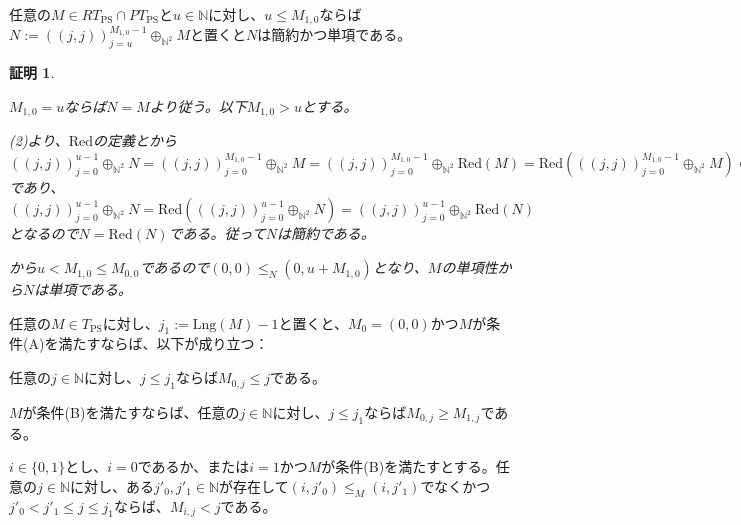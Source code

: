 \documentclass[dvipdfmx,uplatex]{jsarticle}
\theoremstyle{customnonumberbreakfortheorem}
\theoremstyle{customnonumberbreakforproof}
\newtheorem{hideableproof}{証明}
\begin{document}
\begin{lemma}[簡約性と左端の関係]\label{簡約性と左端の関係}
	任意の\(M \in RT_{\textrm{PS}} \cap PT_{\textrm{PS}}\)と\(u \in \mathbb{N}\)に対し、\(u \leq M_{1,0}\)ならば\(N := ((j,j))_{j=u}^{M_{1,0}-1} \oplus_{\mathbb{N}^2} M\)と置くと\(N\)は簡約かつ単項である。
\end{lemma}

\begin{hideableproof}
	\begin{indented}
		\item \(M_{1,0} = u\)ならば\(N = M\)より従う。以下\(M_{1,0} > u\)とする。
		\item {} (2)より、\(\textrm{Red}\)の定義とから\(((j,j))_{j=0}^{u-1} \oplus_{\mathbb{N}^2} N = ((j,j))_{j=0}^{M_{1,0}-1} \oplus_{\mathbb{N}^2} M = ((j,j))_{j=0}^{M_{1,0}-1} \oplus_{\mathbb{N}^2} \textrm{Red}(M) = \textrm{Red}(((j,j))_{j=0}^{M_{1,0}-1} \oplus_{\mathbb{N}^2} M) \in RT_{\textrm{PS}}\)であり、\(((j,j))_{j=0}^{u-1} \oplus_{\mathbb{N}^2} N = \textrm{Red}(((j,j))_{j=0}^{u-1} \oplus_{\mathbb{N}^2} N) = ((j,j))_{j=0}^{u-1} \oplus_{\mathbb{N}^2} \textrm{Red}(N)\)となるので\(N = \textrm{Red}(N)\)である。従って\(N\)は簡約である。
		\item {}から\(u < M_{1,0} \leq M_{0,0}\)であるので\((0,0) \leq_N (0,u+M_{1,0})\)となり、\(M\)の単項性から\(N\)は単項である。
	\end{indented}
\end{hideableproof}

\begin{lemma}[条件(A)と(B)と係数の基本性質]\label{条件(A)と(B)と係数の基本性質}
	任意の\(M \in T_{\textrm{PS}}\)に対し、\(j_1 := \textrm{Lng}(M)-1\)と置くと、\(M_0 = (0,0)\)かつ\(M\)が条件(A)を満たすならば、以下が成り立つ：
	\begin{penumerate}
		\item 任意の\(j \in \mathbb{N}\)に対し、\(j \leq j_1\)ならば\(M_{0,j} \leq j\)である。
		\item \(M\)が条件(B)を満たすならば、任意の\(j \in \mathbb{N}\)に対し、\(j \leq j_1\)ならば\(M_{0,j} \geq M_{1,j}\)である。
		\item \(i \in \{0,1\}\)とし、\(i = 0\)であるか、または\(i = 1\)かつ\(M\)が条件(B)を満たすとする。任意の\(j \in \mathbb{N}\)に対し、ある\(j'_0,j'_1 \in \mathbb{N}\)が存在して\((i,j'_0) \leq_M (i,j'_1)\)でなくかつ\(j'_0 < j'_1 \leq j \leq j_1\)ならば、\(M_{i,j} < j\)である。
	\end{penumerate}
\end{lemma}
\end{document}
